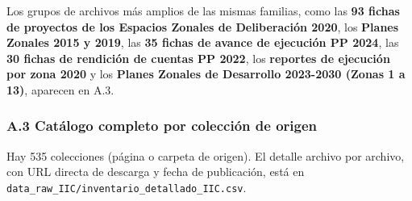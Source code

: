 \documentclass[11pt,a4paper]{article}
\begin{document}
Los grupos de archivos más amplios de las mismas familias, como las \textbf{93 fichas de proyectos de los Espacios Zonales de Deliberación 2020}, los \textbf{Planes Zonales 2015 y 2019}, las \textbf{35 fichas de avance de ejecución PP 2024}, las \textbf{30 fichas de rendición de cuentas PP 2022}, los \textbf{reportes de ejecución por zona 2020} y los \textbf{Planes Zonales de Desarrollo 2023-2030 (Zonas 1 a 13)}, aparecen en A.3.

\subsubsection*{A.3 Catálogo completo por colección de origen}

Hay 535 colecciones (página o carpeta de origen). El detalle archivo por archivo, con URL directa de descarga y fecha de publicación, está en \texttt{data\_\allowbreak{}raw\_\allowbreak{}IIC/\allowbreak{}inventario\_\allowbreak{}detallado\_\allowbreak{}IIC.\allowbreak{}csv}.
\end{document}
